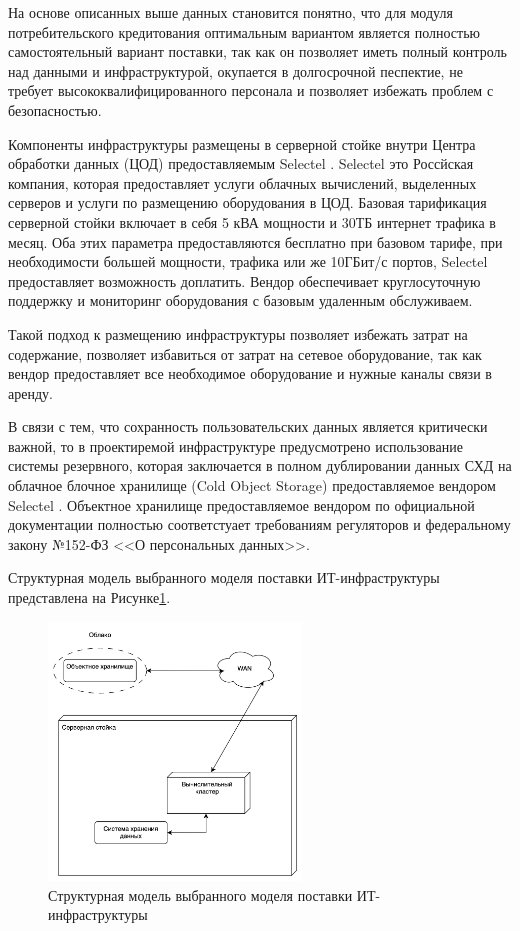 \documentclass[14pt, a4paper]{extarticle}
\begin{document}
На основе описанных выше данных становится понятно, что для модуля потребительского кредитования
оптимальным вариантом является полностью самостоятельный вариант поставки, так как он позволяет
иметь полный контроль над данными и инфраструктурой, окупается в долгосрочной песпектие, не
требует высококвалифицированного персонала и позволяет избежать проблем с безопасностью.

Компоненты инфраструктуры размещены в серверной стойке внутри 
Центра обработки данных (ЦОД) предоставляемым Selectel \cite{selectel-web}.
Selectel это Россйская компания, которая предоставляет услуги облачных вычислений,
выделенных серверов и услуги по размещению оборудования в ЦОД. Базовая тарификация
серверной стойки включает в себя 5 кВА мощности и 30ТБ интернет трафика в месяц.
Оба этих параметра предоставляются бесплатно при базовом тарифе, при необходимости
большей мощности, трафика или же 10ГБит/с портов, Selectel предоставляет возможность 
доплатить. Вендор обеспечивает круглосуточную поддержку и мониторинг оборудования с 
базовым удаленным обслуживаем.

Такой подход к размещению инфраструктуры позволяет избежать затрат на содержание,
позволяет избавиться от затрат на сетевое оборудование, так как вендор предоставляет
все необходимое оборудование и нужные каналы связи в аренду. 

В связи с тем, что сохранность пользовательских данных является критически важной, 
то в проектиремой инфраструктуре предусмотрено использование системы резервного, 
которая заключается в полном дублировании данных СХД на облачное блочное хранилище
(Cold Object Storage) предоставляемое вендором Selectel \cite{selectel-block-storage}.
Объектное хранилище предоставляемое вендором по официальной документации полностью
соответстуает требованиям регуляторов и федеральному закону №152-ФЗ <<О персональных
данных>>.

Структурная модель выбранного моделя поставки ИТ-инфраструктуры представлена на 
Рисунке\;\ref{fig:infra1}.

\begin{figure}[H]
  \centering
  \includegraphics[width=0.6\textwidth]{infra1_3.png}
  \caption{Структурная модель выбранного моделя поставки ИТ-инфраструктуры}
  \label{fig:infra1}
\end{figure}
\end{document}
